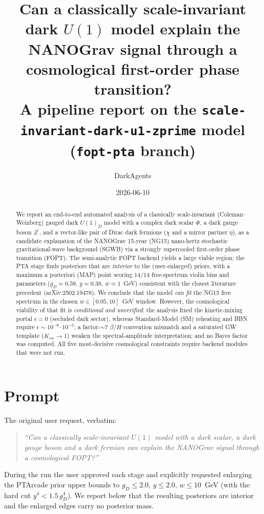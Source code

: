 \documentclass[11pt]{article}
\title{\textbf{Can a classically scale-invariant dark $U(1)$ model explain the\\
NANOGrav signal through a cosmological first-order phase transition?}\\[4pt]
\large A pipeline report on the \texttt{scale-invariant-dark-u1-zprime} model (\texttt{fopt-pta} branch)}
\author{DarkAgents}
\date{2026-06-10}
\newcommand{\Zp}{Z^{\prime}}
\newcommand{\gD}{g_{D}}
\newcommand{\betaH}{\beta/H}
\begin{document}
\maketitle

\begin{abstract}
We report an end-to-end automated analysis of a classically scale-invariant
(Coleman--Weinberg) gauged dark $U(1)_D$ model with a complex dark scalar $\Phi$,
a dark gauge boson $\Zp$, and a vector-like pair of Dirac dark fermions
($\chi$ and a mirror partner $\eta$), as a candidate explanation of the
NANOGrav 15-year (NG15) nano-hertz stochastic gravitational-wave background (SGWB)
via a strongly supercooled first-order phase transition (FOPT).
The semi-analytic FOPT backend yields a large viable region; the PTA stage finds
posteriors that are \emph{interior} to the (user-enlarged) priors, with a maximum
a posteriori (MAP) point scoring $14/14$ free-spectrum violin bins and parameters
($\gD\simeq0.59$, $y\simeq0.38$, $w\simeq1$~GeV) consistent with the closest
literature precedent (arXiv:2502.19478). We conclude that the model
\emph{can fit} the NG15 free spectrum in the chosen $w\in[0.05,10]$~GeV window.
However, the cosmological viability of that fit is \emph{conditional and unverified}:
the analysis fixed the kinetic-mixing portal $\epsilon=0$ (secluded dark sector),
whereas Standard-Model (SM) reheating and BBN require $\epsilon\sim10^{-6}\text{--}10^{-3}$;
a factor-$\sim7$ $\betaH$ convention mismatch and a saturated GW template ($K_{sw}\to1$)
weaken the spectral-amplitude interpretation; and no Bayes factor was computed.
All five most-decisive cosmological constraints require backend modules that were not run.
\end{abstract}

\section{Prompt}
The original user request, verbatim:
\begin{quote}
\itshape ``Can a classically scale-invariant $U(1)$ model with a dark scalar, a dark gauge
boson and a dark fermion can explain the NANOGrav signal through a cosmological FOPT?''
\end{quote}
During the run the user approved each stage and explicitly requested enlarging the
PTArcade prior upper bounds to $\gD\le2.0$, $y\le2.0$, $w\le10$~GeV
(with the hard cut $y^{4}<1.5\,\gD^{4}$). We report below that the resulting posteriors
are interior and the enlarged edges carry no posterior mass.
\end{document}
